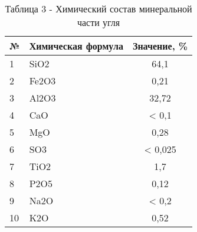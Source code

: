 \begin{table}[H]
\caption*{Таблица 3 - Химический состав минеральной части угля}
\centering
\begin{tabular}{|l|p{}|c|}
\hline
№ & Химическая формула & Значение, \% \\ \hline
1 & SiO2 & 64,1 \\ \hline
2 & Fe2O3 & 0,21 \\ \hline
3 & Al2O3 & 32,72 \\ \hline
4 & CaO & < 0,1 \\ \hline
5 & MgO & 0,28 \\ \hline
6 & SO3 & < 0,025 \\ \hline
7 & TiO2 & 1,7 \\ \hline
8 & P2O5 & 0,12 \\ \hline
9 & Na2O & < 0,2 \\ \hline
10 & K2O & 0,52 \\ \hline
\end{tabular}
\end{table}

